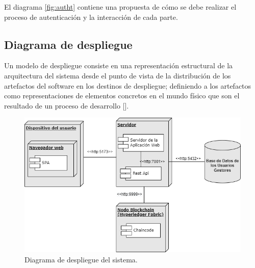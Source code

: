 
El diagrama \ref{fig:autht} contiene una propuesta de cómo se debe realizar el proceso de autenticación y la interacción de cada parte.

%

\subsection{Diagrama de despliegue}
Un modelo de despliegue consiste en una representación estructural de la arquitectura del sistema desde el punto de vista de la distribución de los artefactos del software en los destinos de despliegue; definiendo a los artefactos como representaciones de elementos concretos en el mundo físico que son el resultado de un proceso de desarrollo [\cite{91}]. 

\begin{figure}[htbp]
\centering
\includegraphics[scale=0.65]{Graphics/deploy}
\caption{Diagrama de despliegue del sistema.}
\label{fig:deploy}
\end{figure}


